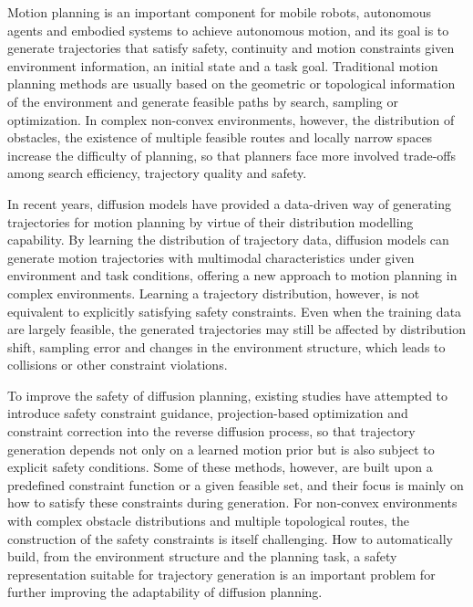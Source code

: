 \documentclass[journal]{IEEEtran}
\begin{document}
Motion planning is an important component for mobile robots, autonomous agents and embodied systems to achieve autonomous motion, and its goal is to generate trajectories that satisfy safety, continuity and motion constraints given environment information, an initial state and a task goal. Traditional motion planning methods are usually based on the geometric or topological information of the environment and generate feasible paths by search, sampling or optimization. In complex non-convex environments, however, the distribution of obstacles, the existence of multiple feasible routes and locally narrow spaces increase the difficulty of planning, so that planners face more involved trade-offs among search efficiency, trajectory quality and safety.

In recent years, diffusion models have provided a data-driven way of generating trajectories for motion planning by virtue of their distribution modelling capability. By learning the distribution of trajectory data, diffusion models can generate motion trajectories with multimodal characteristics under given environment and task conditions, offering a new approach to motion planning in complex environments. Learning a trajectory distribution, however, is not equivalent to explicitly satisfying safety constraints. Even when the training data are largely feasible, the generated trajectories may still be affected by distribution shift, sampling error and changes in the environment structure, which leads to collisions or other constraint violations.

To improve the safety of diffusion planning, existing studies have attempted to introduce safety constraint guidance, projection-based optimization and constraint correction into the reverse diffusion process, so that trajectory generation depends not only on a learned motion prior but is also subject to explicit safety conditions. Some of these methods, however, are built upon a predefined constraint function or a given feasible set, and their focus is mainly on how to satisfy these constraints during generation. For non-convex environments with complex obstacle distributions and multiple topological routes, the construction of the safety constraints is itself challenging. How to automatically build, from the environment structure and the planning task, a safety representation suitable for trajectory generation is an important problem for further improving the adaptability of diffusion planning.
\end{document}
